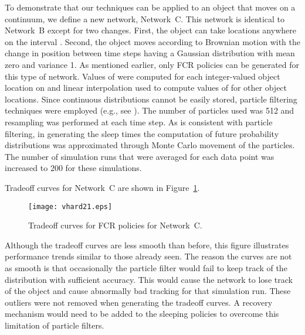 \documentclass[journal,draftcls,onecolumn,11pt]{IEEEtran}
\begin{document}
To demonstrate that our techniques can be applied to an object that moves on a continuum, we define a new network, Network~C.  This network is identical to Network~B except for two changes.  First, the object can take locations anywhere on the interval .  Second, the object moves according to Brownian motion with the change in position between time steps having a Gaussian distribution with mean zero and variance 1.  As mentioned earlier, only FCR policies can be generated for this type of network.  Values of  were computed for each integer-valued object location on  and linear interpolation used to compute values of  for other object locations.  Since continuous distributions cannot be easily stored, particle filtering techniques were employed (e.g., see \cite{doucet01}).  The number of particles used was 512 and resampling was performed at each time step.  As is consistent with particle filtering, in generating the sleep times the computation of future probability distributions was approximated through Monte Carlo movement of the particles.  The number of simulation runs that were averaged for each data point was increased to 200 for these simulations.

Tradeoff curves for Network~C are shown in Figure~\ref{fig:vhard21}.
\begin{figure}
   \begin{center}
      \texttt{[image: vhard21.eps]}
      \caption{Tradeoff curves for FCR policies for Network~C. \label{fig:vhard21}}
   \end{center}
\end{figure}
Although the tradeoff curves are less smooth than before, this figure illustrates performance trends similar to those already seen.  The reason the curves are not as smooth is that occasionally the particle filter would fail to keep track of the distribution with sufficient accuracy.  This would cause the network to lose track of the object and cause abnormally bad tracking for that simulation run.  These outliers were not removed when generating the tradeoff curves.  A recovery mechanism would need to be added to the sleeping policies to overcome this limitation of particle filters.
\end{document}

